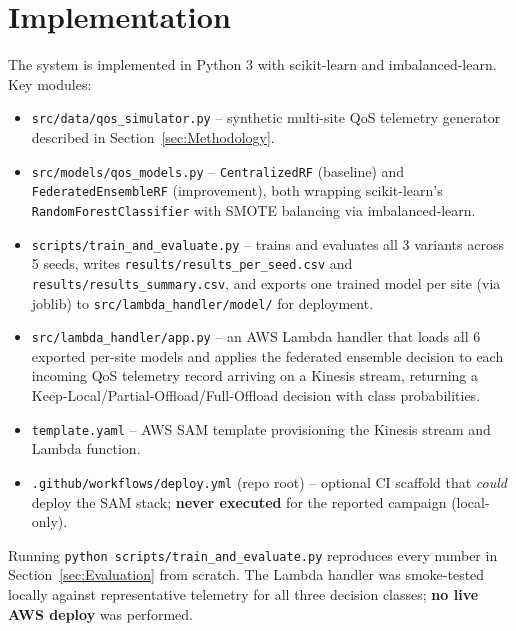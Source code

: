 
\section{Implementation}
\label{sec:Implementation}

The system is implemented in Python 3 with scikit-learn and imbalanced-learn. Key modules:

\begin{itemize}
  \item \texttt{src/data/qos\_simulator.py} -- synthetic multi-site QoS telemetry generator described in Section~\ref{sec:Methodology}.
  \item \texttt{src/models/qos\_models.py} -- \texttt{CentralizedRF} (baseline) and \texttt{FederatedEnsembleRF} (improvement), both wrapping scikit-learn's \texttt{RandomForestClassifier} with SMOTE balancing via imbalanced-learn.
  \item \texttt{scripts/train\_and\_evaluate.py} -- trains and evaluates all 3 variants across 5 seeds, writes \texttt{results/results\_per\_seed.csv} and \texttt{results/results\_summary.csv}, and exports one trained model per site (via joblib) to \texttt{src/lambda\_handler/model/} for deployment.
  \item \texttt{src/lambda\_handler/app.py} -- an AWS Lambda handler that loads all 6 exported per-site models and applies the federated ensemble decision to each incoming QoS telemetry record arriving on a Kinesis stream, returning a Keep-Local/Partial-Offload/Full-Offload decision with class probabilities.
  \item \texttt{template.yaml} -- AWS SAM template provisioning the Kinesis stream and Lambda function.
  \item \texttt{.github/workflows/deploy.yml} (repo root) -- optional CI scaffold that \emph{could} deploy the SAM stack; \textbf{never executed} for the reported campaign (local-only).
\end{itemize}

Running \texttt{python scripts/train\_and\_evaluate.py} reproduces every number in Section~\ref{sec:Evaluation} from scratch. The Lambda handler was smoke-tested locally against representative telemetry for all three decision classes; \textbf{no live AWS deploy} was performed.
